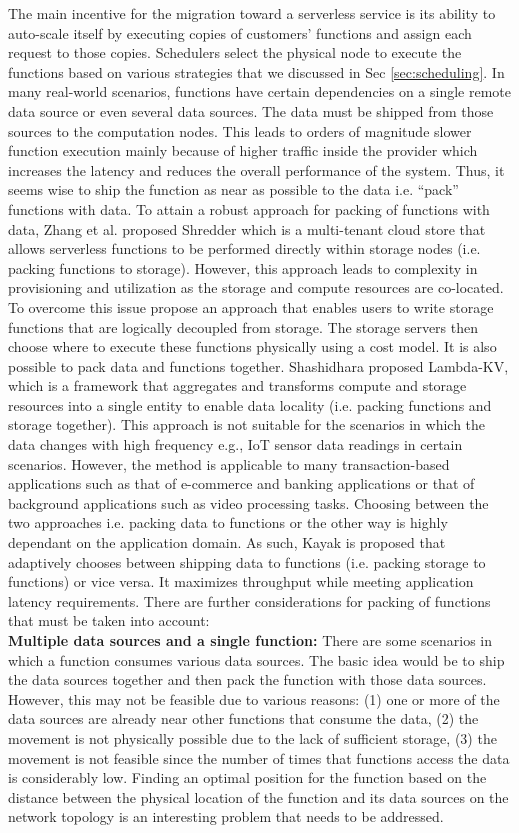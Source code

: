 \label{sec:packing}
The main incentive for the migration toward a serverless service is its ability to auto-scale itself by executing copies of customers' functions and assign each request to those copies. Schedulers select the physical node to execute the functions based on various strategies that we discussed in Sec \ref{sec:scheduling}. In many real-world scenarios, functions have certain dependencies on a single remote data source or even several data sources. The data must be shipped from those sources to the computation nodes. This leads to orders of magnitude slower function execution  mainly because of higher traffic inside the provider which increases the latency and reduces the overall performance of the system. Thus, it seems wise to ship the function as near as possible to the data i.e. ``pack'' functions with data. 
To attain a robust approach for packing of functions with data, Zhang et al.  proposed Shredder which is a multi-tenant cloud store that allows serverless functions to be performed directly within storage nodes (i.e. packing functions to storage). However, this approach leads to complexity in provisioning and utilization as the storage and compute resources are co-located. To overcome this issue  propose an approach that enables users to write storage functions that are logically decoupled from storage. The storage servers then choose where to execute these functions physically using a cost model. 
It is also possible to pack data and functions together. Shashidhara  proposed Lambda-KV, which is a framework that aggregates and transforms compute and storage resources into a single entity to enable data locality (i.e. packing functions and storage together). This approach is not suitable for the scenarios in which the data changes with high frequency e.g., IoT sensor data readings in certain scenarios. However, the method is applicable to many transaction-based applications such as that of e-commerce and banking applications or that of background applications such as video processing tasks.
Choosing between the two approaches i.e. packing data to functions or the other way is highly dependant on the application domain. As such, Kayak  is proposed that adaptively chooses between shipping data to functions (i.e. packing storage to functions) or vice versa. It maximizes throughput while meeting application latency requirements. There are further considerations for packing of functions that must be taken into account:
\\
\noindent \textbf{Multiple data sources and a single function:}  There are some scenarios in which a function consumes various data sources. The basic idea would be to ship the data sources together and then pack the function with those data sources. However, this may not be feasible due to various reasons: (1) one or more of the data sources are already near other functions that consume the data, (2) the movement is not physically possible due to the lack of sufficient storage, (3) the movement is not feasible since the number of times that functions access the data is considerably low. Finding an optimal position for the function based on the distance between the physical location of the function and its data sources on the network topology is an interesting problem that needs to be addressed.
